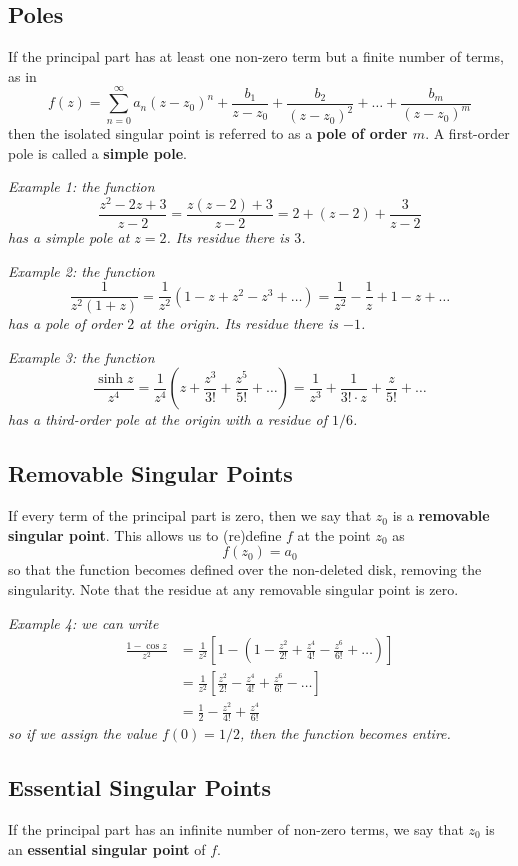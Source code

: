 \documentclass{article}
\renewcommand{\emph}{\textbf}
\begin{document}
\subsection{Poles}
If the principal part has at least one non-zero term but a finite number of terms, as in
\[
	f(z) = \sum_{n=0}^\infty a_n (z - z_0)^n
	+ \frac{b_1}{z - z_0}
	+ \frac{b_2}{(z - z_0)^2} + \dots
	+ \frac{b_m}{(z - z_0)^m}
\]
then the isolated singular point is referred to as a \emph{pole of order $m$}. A first-order pole is called a \emph{simple pole}.

\textit{Example 1: the function
\[
	\frac{z^2 - 2z + 3}{z - 2}
	= \frac{z(z-2) + 3}{z - 2}
	= 2 + (z - 2) + \frac{3}{z - 2}
\]
has a simple pole at $z = 2$. Its residue there is $3$.}

\textit{Example 2: the function
\[
	\frac{1}{z^2(1 + z)}
	= \frac{1}{z^2}(1 - z + z^2 - z^3 + \dots)
	= \frac{1}{z^2} - \frac{1}{z} + 1 - z + \dots
\]
has a pole of order $2$ at the origin. Its residue there is $-1$.}

\textit{Example 3: the function
\[
	\frac{\sinh z}{z^4}
	= \frac{1}{z^4} \left(z + \frac{z^3}{3!} + \frac{z^5}{5!} + \dots \right)
	= \frac{1}{z^3} + \frac{1}{3! \cdot z} + \frac{z}{5!} + \dots
\]
has a third-order pole at the origin with a residue of $1/6$.}

\subsection{Removable Singular Points}
If every term of the principal part is zero, then we say that $z_0$ is a \emph{removable singular point}. This allows us to (re)define $f$ at the point $z_0$ as
\[
	f(z_0) = a_0
\]
so that the function becomes defined over the non-deleted disk, removing the singularity. Note that the residue at any removable singular point is zero.

\textit{Example 4: we can write
\begin{align*}
	\frac{1 - \cos z}{z^2}
	&= \frac{1}{z^2} \left[ 1 - \left(1 - \frac{z^2}{2!} + \frac{z^4}{4!} - \frac{z^6}{6!} + \dots \right) \right] \\
	&= \frac{1}{z^2} \left[ \frac{z^2}{2!} - \frac{z^4}{4!} + \frac{z^6}{6!} - \dots \right] \\
	&= \frac{1}{2} - \frac{z^2}{4!} + \frac{z^4}{6!}
\end{align*}
so if we assign the value $f(0) = 1/2$, then the function becomes entire.}

\subsection{Essential Singular Points}
If the principal part has an infinite number of non-zero terms, we say that $z_0$ is an \emph{essential singular point} of $f$.
\end{document}
